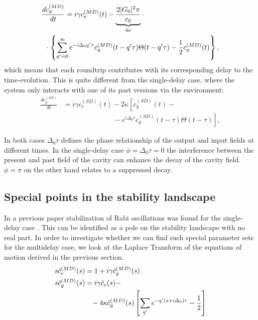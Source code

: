 \documentclass[%
 reprint,
 amsmath,amssymb,
pra,
]{revtex4-1}
\def\qp{{q^\prime}}
\def\qp{{q^\prime}}
\def\ctil{\tilde{c}}
\def\nn{\nonumber}
\newcommand{\lsz}{\left[}
\newcommand{\rsz}{\right]}
\newcommand{\lka}{\left\{}
\newcommand{\rka}{\right\}}
\begin{document}
\begin{align}
\frac{dc_g^{(MD)}}{dt} &= i\gamma c_e^{(MD)}(t) - \underbrace{\frac{2|G_0|^2\pi}{c_0}}_{4\kappa}\cdot\\%
&\hspace{-1cm}\cdot\lka\sum_{\qp=0}^{\infty}e^{-i\Delta_0\qp\tau} c_{g}^{(MD)}(t-\qp\tau)\Theta(t-\qp\tau)-\frac{1}{2}c_g^{(MD)}(t)\rka,\nn
\end{align}
which means that each roundtrip contributes with its corresponding delay to the time-evolution. This is quite different from the single-delay case, where the system only interacts with one of its past versions via the environment:
\begin{align}
\frac{dc_g^{(SD)}}{dt} &= i\gamma c_e^{(SD)}(t) - 2\kappa\lsz c_g^{(SD)}(t)-\right.\\ &\left.\hspace{3cm}-e^{i\Delta_0\tau}c_{g}^{(SD)}(t-\tau)\Theta(t-\tau)\rsz,\nn
\end{align}

In both cases $\Delta_0\tau$ defines the phase relationship of the output and input fields at different times. In the single-delay case $\phi=\Delta_0\tau=0$ the interference between the present and past field of the cavity can enhance the decay of the cavity field. $\phi=\pi$ on the other hand relates to a suppressed decay.

\clearpage
\subsection{Special points in the stability landscape}
In a previous paper stabilization of Rabi oscillations was found for the single-delay case \cite{Kabuss2015}. This can be identified as a pole on the stability landscape with no real part. In order to investigate whether we can find such special parameter sets for the multidelay case, we look at the Laplace Transform of the equations of motion derived in the previous section.
\begin{align}
\label{eq:lap_ce}
s\ctil_e^{(MD)}(s) &= 1+i\gamma\ctil_g^{(MD)}(s)\\
\label{eq:lap_cg}
s\ctil_g^{(MD)}(s) &= i\gamma\ctil_e(s) -\nn\\
&\hspace{.3cm}-4\kappa\ctil_g^{(MD)}(s)\lsz\sum_\qp e^{-\qp(s+i\Delta_0)\tau}-\frac{1}{2}\rsz
\end{align}
\end{document}
